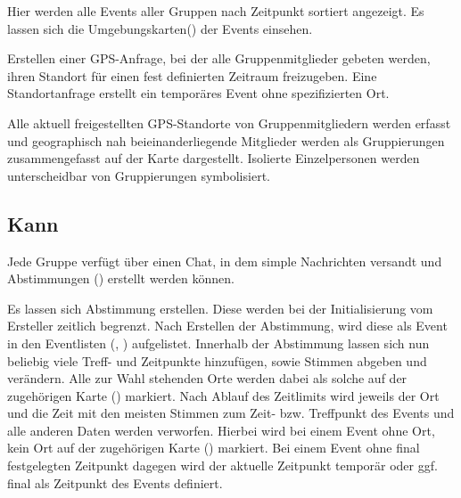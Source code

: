 \documentclass[parskip=full,11pt]{scrartcl}
\begin{document}
Hier werden alle Events aller Gruppen nach Zeitpunkt sortiert angezeigt.
Es lassen sich die Umgebungskarten() der Events einsehen.


Erstellen einer GPS-Anfrage, bei der alle Gruppenmitglieder gebeten werden,
ihren Standort für einen fest definierten Zeitraum freizugeben.
Eine Standortanfrage erstellt ein temporäres Event ohne spezifizierten Ort.

Alle aktuell freigestellten GPS-Standorte von Gruppenmitgliedern werden erfasst
und geographisch nah beieinanderliegende Mitglieder werden als Gruppierungen
zusammengefasst auf der Karte dargestellt.
Isolierte Einzelpersonen werden unterscheidbar von Gruppierungen symbolisiert.

\subsection{Kann}

Jede Gruppe verfügt über einen Chat, in dem simple Nachrichten versandt und
Abstimmungen () erstellt werden können.

Es lassen sich Abstimmung erstellen.
Diese werden bei der Initialisierung vom Ersteller zeitlich begrenzt.
Nach Erstellen der Abstimmung, wird diese als Event in den
Eventlisten (, ) aufgelistet.
Innerhalb der Abstimmung lassen sich nun beliebig viele Treff- und Zeitpunkte hinzufügen, sowie Stimmen abgeben und verändern.
Alle zur Wahl stehenden Orte werden dabei als solche auf der zugehörigen Karte () markiert.
Nach Ablauf des Zeitlimits wird jeweils der Ort und die Zeit mit den meisten Stimmen
zum Zeit- bzw. Treffpunkt des Events und alle anderen Daten werden verworfen.
Hierbei wird bei einem Event ohne Ort, kein Ort auf der zugehörigen Karte () markiert.
Bei einem Event ohne final festgelegten Zeitpunkt dagegen wird der aktuelle Zeitpunkt
temporär oder ggf. final als Zeitpunkt des Events definiert.
\end{document}
